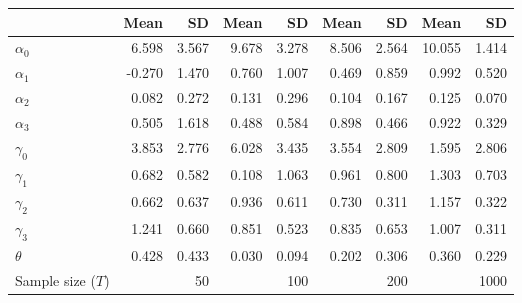 
\begin{tabular}[t]{lrrrrrrrr}
\toprule
  & Mean & SD & Mean  & SD  & Mean   & SD   & Mean    & SD   \\
\midrule
$\alpha_{0}$ & 6.598 & 3.567 & 9.678 & 3.278 & 8.506 & 2.564 & 10.055 & 1.414\\
$\alpha_{1}$ & -0.270 & 1.470 & 0.760 & 1.007 & 0.469 & 0.859 & 0.992 & 0.520\\
$\alpha_{2}$ & 0.082 & 0.272 & 0.131 & 0.296 & 0.104 & 0.167 & 0.125 & 0.070\\
$\alpha_{3}$ & 0.505 & 1.618 & 0.488 & 0.584 & 0.898 & 0.466 & 0.922 & 0.329\\
$\gamma_{0}$ & 3.853 & 2.776 & 6.028 & 3.435 & 3.554 & 2.809 & 1.595 & 2.806\\
$\gamma_{1}$ & 0.682 & 0.582 & 0.108 & 1.063 & 0.961 & 0.800 & 1.303 & 0.703\\
$\gamma_{2}$ & 0.662 & 0.637 & 0.936 & 0.611 & 0.730 & 0.311 & 1.157 & 0.322\\
$\gamma_{3}$ & 1.241 & 0.660 & 0.851 & 0.523 & 0.835 & 0.653 & 1.007 & 0.311\\
$\theta$ & 0.428 & 0.433 & 0.030 & 0.094 & 0.202 & 0.306 & 0.360 & 0.229\\
Sample size ($T$) &  & 50 &  & 100 &  & 200 &  & 1000\\
\bottomrule
\end{tabular}
